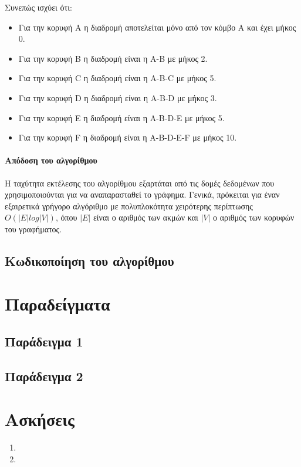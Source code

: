 Συνεπώς ισχύει ότι: 
\begin{itemize}[noitemsep]
\item Για την κορυφή A η διαδρομή αποτελείται μόνο από τον κόμβο A και έχει μήκος 0.
\item Για την κορυφή B η διαδρομή είναι η A-B με μήκος 2.
\item Για την κορυφή C η διαδρομή είναι η A-B-C με μήκος 5.
\item Για την κορυφή D η διαδρομή είναι η A-B-D με μήκος 3.
\item Για την κορυφή E η διαδρομή είναι η A-B-D-E με μήκος 5.
\item Για την κορυφή F η διαδρομή είναι η A-B-D-E-F με μήκος 10.
\end{itemize}

\paragraph{Απόδοση του αλγορίθμου}

Η ταχύτητα εκτέλεσης του αλγορίθμου εξαρτάται από τις δομές δεδομένων που χρησιμοποιούνται για να αναπαρασταθεί το γράφημα. Γενικά, πρόκειται για έναν εξαιρετικά γρήγορο αλγόριθμο με πολυπλοκότητα χειρότερης περίπτωσης $O(|E| log |V|)$, όπου $|E|$ είναι ο αριθμός των ακμών και $|V|$ ο αριθμός των κορυφών του γραφήματος.

\subsection{Κωδικοποίηση του αλγορίθμου}


\section{Παραδείγματα}

\subsection{Παράδειγμα 1}

\subsection{Παράδειγμα 2}


\section{Ασκήσεις}
\begin{enumerate}
\item 
\item 
\end{enumerate}

\begin{thebibliography}{9}
\end{thebibliography}

